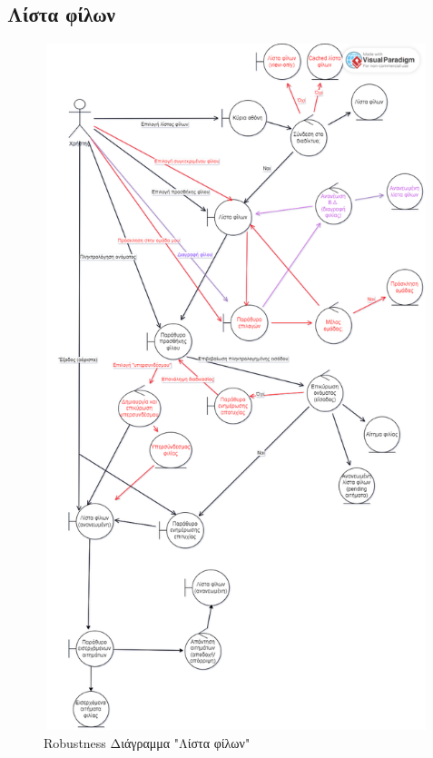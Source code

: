 \subsection{Λίστα φίλων}
\begin{figure}[!htb]
  \begin{center}
    \includegraphics[width=18cm,height=20cm]{robust_friends.png}
    \caption{Robustness Διάγραμμα "Λίστα φίλων"}
    \label{}
     \end{center}
\end{figure}
\newpage


